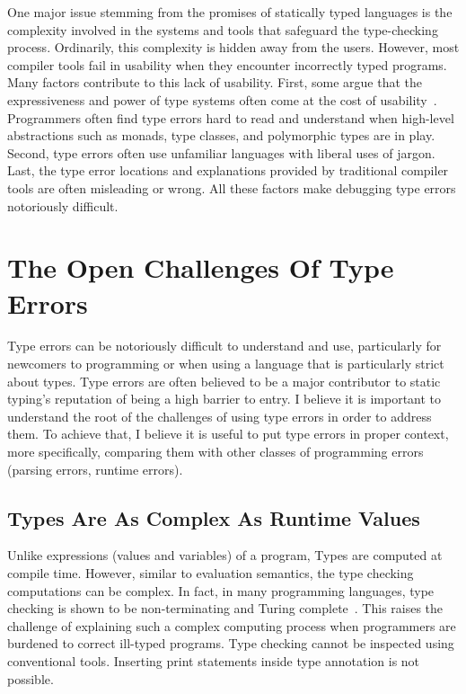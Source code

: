 One major issue stemming from the promises of statically typed languages is the complexity involved in the systems and tools that safeguard the type-checking process. Ordinarily, this complexity is hidden away from the users. However, most compiler tools fail in usability when they encounter incorrectly typed programs. Many factors contribute to this lack of usability. First, some argue that the expressiveness and power of type systems often come at the cost of usability~\cite{Hage2020-hg}.  Programmers often find type errors hard to read and understand when high-level abstractions such as monads, type classes, and polymorphic types are in play. Second, type errors often use unfamiliar languages with liberal uses of jargon. Last, the type error locations and explanations provided by traditional compiler tools are often misleading or wrong. All these factors make debugging type errors notoriously difficult.

\section{The Open Challenges Of Type Errors}

Type errors can be notoriously difficult to understand and use, particularly for newcomers to programming or when using a language that is particularly strict about types. Type errors are often believed to be a major contributor to static typing's reputation of being a high barrier to entry. I believe it is important to understand the root of the challenges of using type errors in order to address them. To achieve that, I believe it is useful to put type errors in proper context, more specifically, comparing them with other classes of programming errors (parsing errors, runtime errors). 

\subsection{Types Are As Complex As Runtime Values}

Unlike expressions (values and variables) of a program, Types are computed at compile time. However, similar to evaluation semantics, the type checking computations can be complex. In fact, in many programming languages, type checking is shown to be non-terminating and Turing complete~\cite{Wells1999-ob}. This raises the challenge of explaining such a complex computing process when programmers are burdened to correct ill-typed programs. Type checking cannot be inspected using conventional tools. Inserting print statements inside type annotation is not possible. 


